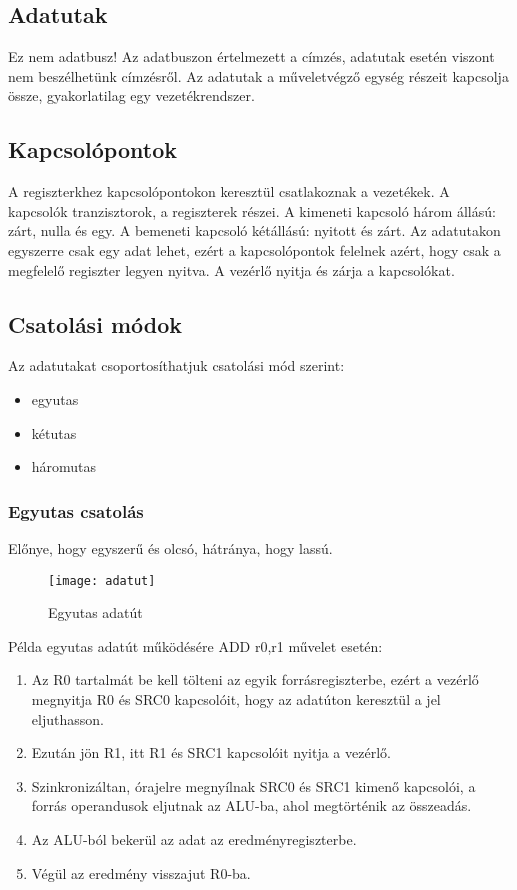 \subsection{Adatutak}
Ez nem adatbusz!
Az adatbuszon értelmezett a címzés, adatutak esetén viszont nem beszélhetünk címzésről.
Az adatutak a műveletvégző egység részeit kapcsolja össze, gyakorlatilag egy vezetékrendszer.

\subsection{Kapcsolópontok}
A regiszterkhez kapcsolópontokon keresztül csatlakoznak a vezetékek.
A kapcsolók tranzisztorok, a regiszterek részei.
A kimeneti kapcsoló három állású: zárt, nulla és egy.
A bemeneti kapcsoló kétállású: nyitott és zárt.
Az adatutakon egyszerre csak egy adat lehet, ezért a kapcsolópontok felelnek azért, hogy csak a megfelelő regiszter legyen nyitva.
A vezérlő nyitja és zárja a kapcsolókat.

\subsection{Csatolási módok}
Az adatutakat csoportosíthatjuk csatolási mód szerint:
\begin{itemize}
    \item egyutas
    \item kétutas
    \item háromutas
\end{itemize}

\subsubsection{Egyutas csatolás}
Előnye, hogy egyszerű és olcsó, hátránya, hogy lassú.
\begin{figure}[H]
    \texttt{[image: adatut]}
    \centering
    \caption{Egyutas adatút}
    \label{fig:adatut}
\end{figure}
Példa egyutas adatút működésére ADD r0,r1 művelet esetén:
\begin{enumerate}
    \item Az R0 tartalmát be kell tölteni az egyik forrásregiszterbe, ezért a vezérlő megnyitja R0 és SRC0 kapcsolóit, hogy az adatúton keresztül a jel eljuthasson.
    \item Ezután jön R1, itt R1 és SRC1 kapcsolóit nyitja a vezérlő.
    \item Szinkronizáltan, órajelre megnyílnak SRC0 és SRC1 kimenő kapcsolói, a forrás operandusok eljutnak az ALU-ba, ahol megtörténik az összeadás.
    \item Az ALU-ból bekerül az adat az eredményregiszterbe.
    \item Végül az eredmény visszajut R0-ba.
\end{enumerate}

